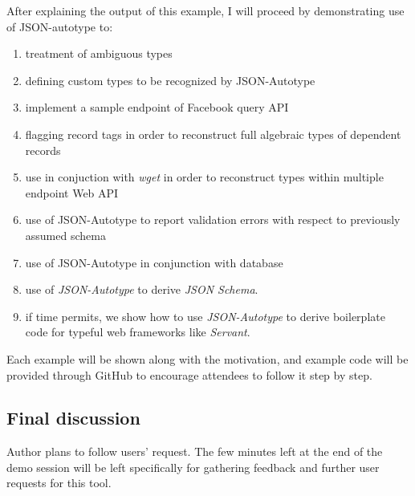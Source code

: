 \documentclass[11pt]{article}
\begin{document}
After explaining the output of this example, I will proceed by demonstrating use of JSON-autotype to:
\begin{enumerate}
\item treatment of ambiguous types
\item defining custom types to be recognized by JSON-Autotype
\item implement a sample endpoint of Facebook query API
\item flagging record tags in order to reconstruct full algebraic types of dependent records
\item use in conjuction with \emph{wget} in order to reconstruct types within multiple endpoint Web API
\item use of JSON-Autotype to report validation errors with respect to previously assumed schema
\item use of JSON-Autotype in conjunction with database
\item use of \emph{JSON-Autotype} to derive \emph{JSON Schema}.
\item if time permits, we show how to use \emph{JSON-Autotype} to derive boilerplate code for typeful web frameworks like \emph{Servant}.
\end{enumerate}

Each example will be shown along with the motivation, and example code will be provided through GitHub to encourage attendees to follow it step by step.

\subsection*{Final discussion}
Author plans to follow users' request. The few minutes left at the end of the demo session will be left specifically for gathering feedback and further user requests for this tool.

\end{document}
